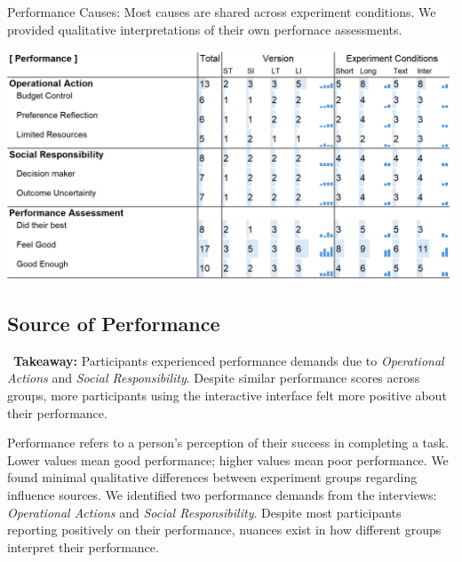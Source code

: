 
\begin{table}[h]
    \caption{Performance Causes: Most causes are shared across experiment conditions. We provided qualitative interpretations of their own perfornace assessments.}
    \label{tbl:physical}
    \includegraphics[width=\linewidth]{content/image/cog/perf_table.png}
\end{table}

\subsection{Source of Performance}
\label{sec:performance}
\vspace{5pt}

\begin{tldrbox}
    \faInfoCircle~\xspace\textbf{Takeaway:} Participants experienced performance demands due to \textit{Operational Actions} and \textit{Social Responsibility}. Despite similar performance scores across groups, more participants using the interactive interface felt more positive about their performance.
\end{tldrbox}

Performance refers to a person's perception of their success in completing a task. Lower values mean good performance; higher values mean poor performance. We found minimal qualitative differences between experiment groups regarding influence sources. We identified two performance demands from the interviews: \textit{Operational Actions} and \textit{Social Responsibility}. Despite most participants reporting positively on their performance, nuances exist in how different groups interpret their performance.

